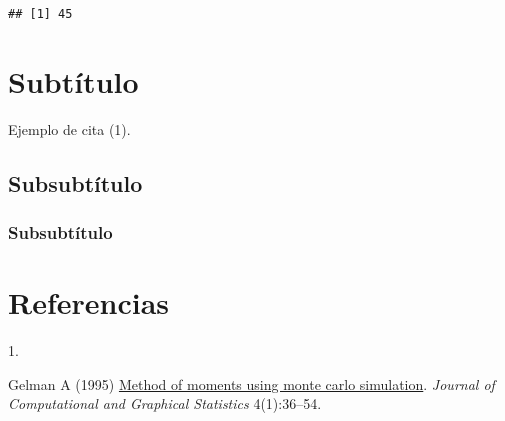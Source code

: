 \documentclass[9pt,twocolumn,twoside,]{pnas-new}
\newlength{\csllabelwidth}
\newlength{\cslhangindent}
\newenvironment{CSLReferences}[2] %
 {%
  \setlength{\parindent}{0pt}
  \ifodd #1 \everypar{\setlength{\hangindent}{\cslhangindent}}\ignorespaces\fi
  \ifnum #2 > 0
  \setlength{\parskip}{#2\baselineskip}
  \fi
 }%
 {}
\newcommand{\CSLLeftMargin}[1]{\parbox[t]{\csllabelwidth}{#1}}
\newcommand{\CSLRightInline}[1]{\parbox[t]{\linewidth - \csllabelwidth}{#1}\break}
\begin{document}
\begin{verbatim}
## [1] 45
\end{verbatim}

\hypertarget{subtuxedtulo}{%
\section*{Subtítulo}\label{subtuxedtulo}}

Ejemplo de cita (1).

\lipsum[2-4]

\hypertarget{subsubtuxedtulo}{%
\subsection*{Subsubtítulo}\label{subsubtuxedtulo}}

\lipsum[4-6]

\hypertarget{subsubtuxedtulo-1}{%
\subsubsection*{Subsubtítulo}\label{subsubtuxedtulo-1}}

\lipsum[6-8]

\hypertarget{referencias}{%
\section*{Referencias}\label{referencias}}

\showmatmethods
\showacknow
\pnasbreak

\hypertarget{refs}{}
\begin{CSLReferences}{0}{0}
\leavevmode{}%
\CSLLeftMargin{1. }
\CSLRightInline{Gelman A (1995)
\href{http://www.jstor.org/stable/1390626}{Method of moments using monte
carlo simulation}. \emph{Journal of Computational and Graphical
Statistics} 4(1):36--54.}

\end{CSLReferences}



% 
\end{document}
